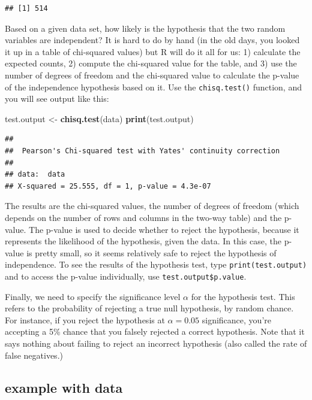 \documentclass[
]{book}
\newenvironment{Shaded}{\begin{snugshade}}{\end{snugshade}}
\newcommand{\KeywordTok}[1]{\textcolor[rgb]{0.13,0.29,0.53}{\textbf{#1}}}
\newcommand{\NormalTok}[1]{#1}
\newcommand{\StringTok}[1]{\textcolor[rgb]{0.31,0.60,0.02}{#1}}
\theoremstyle{definition}
\theoremstyle{definition}
\theoremstyle{definition}
\theoremstyle{remark}
\begin{document}
\begin{verbatim}
## [1] 514
\end{verbatim}

Based on a given data set, how likely is the hypothesis that the two random variables are independent? It is hard to do by hand (in the old days, you looked it up in a table of chi-squared values) but R will do it all for us: 1) calculate the expected counts, 2) compute the chi-squared value for the table, and 3) use the number of degrees of freedom and the chi-squared value to calculate the p-value of the independence hypothesis based on it. Use the \texttt{chisq.test()} function, and you will see output like this:

\begin{Shaded}
\begin{Highlighting}[]
\NormalTok{test.output \textless{}{-}}\StringTok{ }\KeywordTok{chisq.test}\NormalTok{(data)}
\KeywordTok{print}\NormalTok{(test.output)}
\end{Highlighting}
\end{Shaded}

\begin{verbatim}
## 
##  Pearson's Chi-squared test with Yates' continuity correction
## 
## data:  data
## X-squared = 25.555, df = 1, p-value = 4.3e-07
\end{verbatim}

The results are the chi-squared values, the number of degrees of freedom (which depends on the number of rows and columns in the two-way table) and the p-value. The p-value is used to decide whether to reject the hypothesis, because it represents the likelihood of the hypothesis, given the data. In this case, the p-value is pretty small, so it seems relatively safe to reject the hypothesis of independence. To see the results of the hypothesis test, type \texttt{print(test.output)} and to access the p-value individually, use \texttt{test.output\$p.value}.

Finally, we need to specify the significance level \(\alpha\) for the hypothesis test. This refers to the probability of rejecting a true null hypothesis, by random chance. For instance, if you reject the hypothesis at \(\alpha=0.05\) significance, you're accepting a 5\% chance that you falsely rejected a correct hypothesis. Note that it says nothing about failing to reject an incorrect hypothesis (also called the rate of false negatives.)

\hypertarget{example-with-data}{%
\subsection{example with data}\label{example-with-data}}
\end{document}
